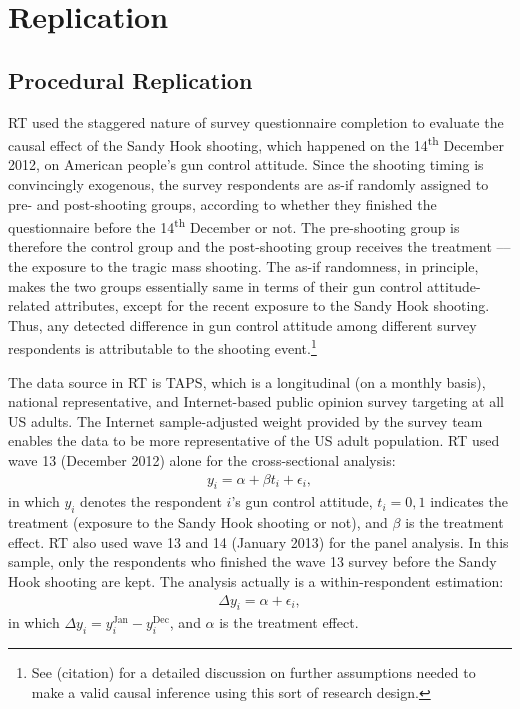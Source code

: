 \documentclass[11pt]{article}
\begin{document}
\section*{Replication}
\subsection*{Procedural Replication}
RT used the staggered nature of survey questionnaire completion to evaluate the causal effect of the Sandy Hook shooting, which happened on the 14\textsuperscript{th} December 2012, on American people’s gun control attitude. Since the shooting timing is convincingly exogenous, the survey respondents are as-if randomly assigned to pre- and post-shooting groups, according to whether they finished the questionnaire before the 14\textsuperscript{th} December or not. The pre-shooting group is therefore the control group and the post-shooting group receives the treatment –– the exposure to the tragic mass shooting. The as-if randomness, in principle, makes the two groups essentially same in terms of their gun control attitude-related attributes, except for the recent exposure to the Sandy Hook shooting. Thus, any detected difference in gun control attitude among different survey respondents is attributable to the shooting event.\footnote{See (citation) for a detailed discussion on further assumptions needed to make a valid causal inference using this sort of research design.}

The data source in RT is TAPS, which is a longitudinal (on a monthly basis), national representative, and Internet-based public opinion survey targeting at all US adults. The Internet sample-adjusted weight provided by the survey team enables the data to be more representative of the US adult population. RT used wave 13 (December 2012) alone for the cross-sectional analysis:
\begin{align}
y_{i} = \alpha + \beta t_{i} + \epsilon_{i},
\end{align}
in which \(y_i\) denotes the respondent \(i\)’s gun control attitude, \(t_i = 0, 1\) indicates the treatment (exposure to the Sandy Hook shooting or not), and \(\beta\) is the treatment effect. RT also used wave 13 and 14 (January 2013) for the panel analysis. In this sample, only the respondents who finished the wave 13 survey before the Sandy Hook shooting are kept. The analysis actually is a within-respondent estimation:
\begin{align}
\Delta y_{i} = \alpha + \epsilon_{i},
\end{align}
in which \(\Delta y_{i} = y_{i}^{\text{Jan}} - y_{i}^{\text{Dec}}\), and \(\alpha\) is the treatment effect. 
\end{document}
